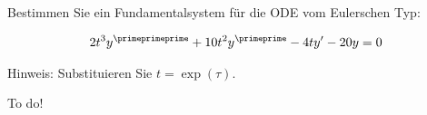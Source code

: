 \begin{exercise}
  Bestimmen Sie ein Fundamentalsystem für die ODE vom Eulerschen Typ:

  \begin{align*}
    2t^3 y^{\primeprimeprime} + 10t^2 y^{\primeprime}- 4ty^{\prime}- 20y = 0
  \end{align*}

  Hinweis: Substituieren Sie $t = \exp(\tau)$.
\end{exercise}

\begin{solution}
  To do!
\end{solution}
